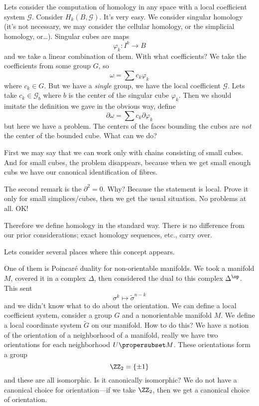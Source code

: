 Lets consider the computation of homology in any space with a
local coefficient system $\mathscr{G}$. Consider
$H_{k}(B,\mathscr{G})$. It's very easy. We consider singular
homology (it's not necessary, we may consider the cellular
homology, or the simplicial homology, or\dots). Singular cubes
are maps
\begin{equation}
\varphi_{k}\colon I^{k}\to B
\end{equation}
and we take a linear combination of them. With what coefficients?
We take the coefficients from some group $G$, so
\begin{equation}
\omega=\sum c_{k}\varphi_{k}
\end{equation}
where $c_{k}\in G$. But we have a \emph{single} group, we have
the local coefficient $\mathscr{G}$. Lets take
$c_{k}\in\mathscr{G}_{b}$ where $b$ is the center of the singular
cube $\varphi_{k}$. Then we should imitate the definition we gave
in the obvious way, define
\begin{equation}
\partial\omega=\sum c_{k}\partial\varphi_{k}
\end{equation}
but here we have a problem. The centers of the faces bounding the
cubes are \emph{not} the center of the bounded cube. What can we
do?

First we may say that we can work only with chains consisting of
small cubes. And for small cubes, the problem disappears, because
when we get small enough cubs we have our canonical
identification of fibres. 

The second remark is the $\partial^{2}=0$. Why? Because the
statement is local. Prove it only for small simplices/cubes, then
we get the usual situation. No problems at all. OK!

Therefore we define homology in the standard way. There is no
difference from our prior considerations; exact homology
sequences, etc., carry over.

Lets consider several places where this concept appears.

One of them is Poincar\'e duality for non-orientable
manifolds. We took a manifold $M$, covered it in a complex
$\Delta$, then considered the dual to this complex
$\Delta^{\op}$. This sent
\begin{equation}
\sigma^{k}\mapsto\widetilde{\sigma}^{n-k}
\end{equation}
and we didn't know what to do about the orientation. We can
define a local coefficient system, consider a group $G$ and a
nonorientable manifold $M$. We define a local coordinate system
$\widetilde{G}$ on our manifold. How to do this? We have a notion
of the orientation of a neighborhood of a manifold, really we
have two orientations for each neighborhood $U\propersubset
M$. These orientations form a group 
\begin{equation}
\ZZ_{2}=\{\pm1\}
\end{equation}
and these are all isomorphic. Is it canonically isomorphic? We do
not have a canonical choice for orientation---if we take
$\ZZ_{2}$, then we get a canonical choice of orientation.

